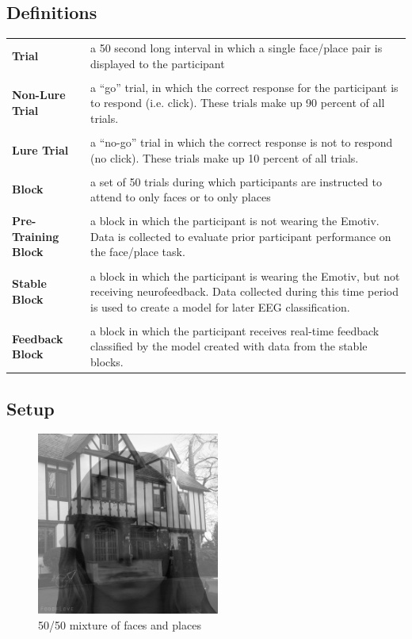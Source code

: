 \documentclass[12pt]{report}
\begin{document}
\subsection{Definitions}
\begin{table}[h]
\begin{tabular}{p{4cm}|p{10cm}}
\textbf{Trial}  & a 50 second long interval in which a single face/place pair is displayed to the participant  \\
\\
\textbf{Non-Lure Trial} & a “go” trial, in which the correct response for the participant is to respond (i.e. click).  These trials make up 90 percent of all trials.\\
\\
\textbf{Lure Trial}  & a “no-go” trial in which the correct response is not to respond (no click).  These trials make up 10 percent of all trials.\\
\\
\textbf{Block} & a set of 50 trials during which participants are instructed to attend to only faces or to only places\\
\\
\textbf{Pre-Training Block}  & a block in which the participant is not wearing the Emotiv.  Data is collected to evaluate prior participant performance on the face/place task. \\
\\
\textbf{Stable Block} & a block in which the participant is wearing the Emotiv, but not receiving neurofeedback.  Data collected during this time period is used to create a model for later EEG classification.\\
\\
\textbf{Feedback Block} & a block in which the participant receives real-time feedback classified by the model created with data from the stable blocks.
\end{tabular}
\end{table}

\subsection{Setup}
	\begin{figure}
	
	\includegraphics[width=6cm]{faceplace}	
	\centering
	\caption{50/50 mixture of faces and places}
	\end{figure}
	
\end{document}
